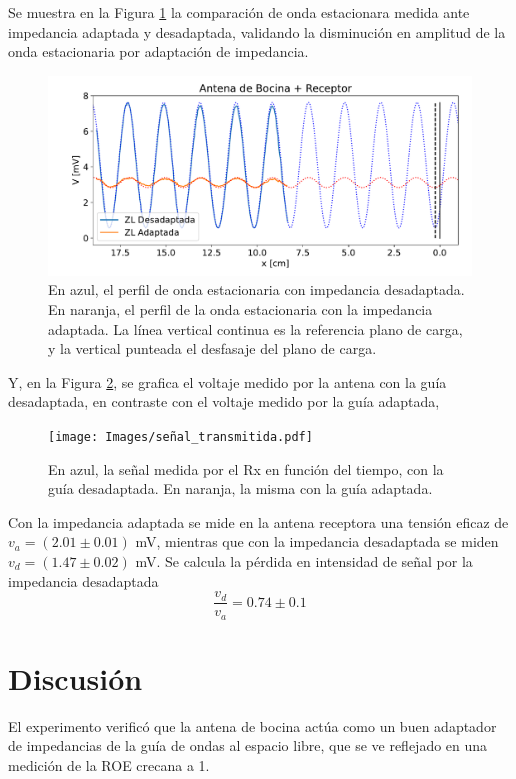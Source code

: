 \documentclass[11pt,a4paper]{article}
\begin{document}
\begin{multicols}{2}
Se muestra en la Figura \ref{fig:bocirec} la comparación de onda estacionara medida ante impedancia adaptada y desadaptada, validando la disminución en amplitud de la onda estacionaria por adaptación de impedancia. 
\begin{figure}[H]
    \centering
    \includegraphics[width=\linewidth]{Images/bocina_receptor.pdf}
    \caption{En azul, el perfil de onda estacionaria con impedancia desadaptada. 
    En naranja, el perfil de la onda estacionaria con la impedancia adaptada. 
    La línea vertical continua es la referencia plano de carga, y la vertical punteada el desfasaje del plano de carga.}
    \label{fig:bocirec}
\end{figure}

Y, en la Figura \ref{fig:senal}, se grafica el voltaje medido por la antena con la guía desadaptada, en contraste con el voltaje medido por la guía adaptada,
\begin{figure}[H]
    \centering
    \texttt{[image: Images/señal\_transmitida.pdf]}
    \caption{En azul, la señal medida por el Rx en función del tiempo, con la guía desadaptada. En naranja, la misma con la guía adaptada.}
    \label{fig:senal}
\end{figure}

Con la impedancia adaptada se mide en la antena receptora una tensión eficaz de $v_a = (2.01 \pm 0.01)$ mV, mientras que con la impedancia desadaptada se miden $v_d = (1.47\pm0.02)$ mV. Se calcula la pérdida en intensidad de señal por la impedancia desadaptada
\begin{equation*}
    \frac{v_{d}}{v_{a}} = 0.74 \pm 0.1
\end{equation*}

\section{Discusión}


El experimento verificó que la antena de bocina actúa como un buen adaptador de impedancias de la guía de ondas al espacio libre, que se ve reflejado en una medición de la ROE crecana a 1. \\


\end{multicols}
\end{document}
